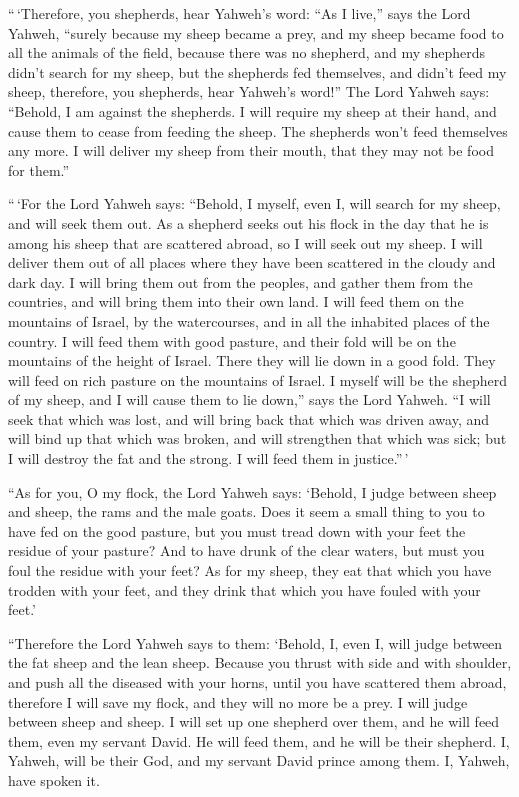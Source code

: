 ``\,`Therefore, you shepherds, hear Yahweh's word:
 ``As I live,'' says the Lord Yahweh, ``surely because my
sheep became a prey, and my sheep became food to all the animals of the
field, because there was no shepherd, and my shepherds didn't search for
my sheep, but the shepherds fed themselves, and didn't feed my sheep,
 therefore, you shepherds, hear Yahweh's word!''
 The Lord Yahweh says: ``Behold, I am against the
shepherds. I will require my sheep at their hand, and cause them to
cease from feeding the sheep. The shepherds won't feed themselves any
more. I will deliver my sheep from their mouth, that they may not be
food for them.''

 ``\,`For the Lord Yahweh says: ``Behold, I myself, even
I, will search for my sheep, and will seek them out.  As
a shepherd seeks out his flock in the day that he is among his sheep
that are scattered abroad, so I will seek out my sheep. I will deliver
them out of all places where they have been scattered in the cloudy and
dark day.  I will bring them out from the peoples, and
gather them from the countries, and will bring them into their own land.
I will feed them on the mountains of Israel, by the watercourses, and in
all the inhabited places of the country.  I will feed
them with good pasture, and their fold will be on the mountains of the
height of Israel. There they will lie down in a good fold. They will
feed on rich pasture on the mountains of Israel.  I
myself will be the shepherd of my sheep, and I will cause them to lie
down,'' says the Lord Yahweh.  ``I will seek that which
was lost, and will bring back that which was driven away, and will bind
up that which was broken, and will strengthen that which was sick; but I
will destroy the fat and the strong. I will feed them in justice.''\,'

 ``As for you, O my flock, the Lord Yahweh says: `Behold,
I judge between sheep and sheep, the rams and the male goats.
 Does it seem a small thing to you to have fed on the
good pasture, but you must tread down with your feet the residue of your
pasture? And to have drunk of the clear waters, but must you foul the
residue with your feet?  As for my sheep, they eat that
which you have trodden with your feet, and they drink that which you
have fouled with your feet.'

 ``Therefore the Lord Yahweh says to them: `Behold, I,
even I, will judge between the fat sheep and the lean sheep.
 Because you thrust with side and with shoulder, and push
all the diseased with your horns, until you have scattered them abroad,
 therefore I will save my flock, and they will no more be
a prey. I will judge between sheep and sheep.  I will set
up one shepherd over them, and he will feed them, even my servant David.
He will feed them, and he will be their shepherd.  I,
Yahweh, will be their God, and my servant David prince among them. I,
Yahweh, have spoken it.

